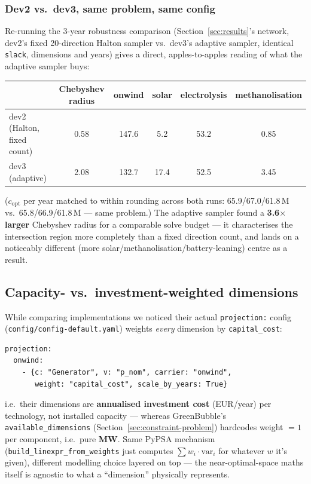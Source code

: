 \documentclass[11pt]{article}
\begin{document}
\subsubsection{Dev2 vs.\ dev3, same problem, same config}
Re-running the 3-year robustness comparison (Section~\ref{sec:results}'s
network, dev2's fixed 20-direction Halton sampler vs.\ dev3's adaptive
sampler, identical \texttt{slack}, dimensions and years) gives a direct,
apples-to-apples reading of what the adaptive sampler buys:

\begin{center}
\small
\begin{tabular}{@{}lccccc@{}}
\toprule
 & Chebyshev radius & onwind & solar & electrolysis & methanolisation \\
\midrule
dev2 (Halton, fixed count) & 0.58 & 147.6 & 5.2 & 53.2 & 0.85 \\
dev3 (adaptive)            & 2.08 & 132.7 & 17.4 & 52.5 & 3.45 \\
\bottomrule
\end{tabular}
\end{center}
($c_{\mathrm{opt}}$ per year matched to within rounding across both runs:
65.9/67.0/61.8\,M vs.\ 65.8/66.9/61.8\,M --- same problem.) The adaptive
sampler found a \textbf{3.6$\times$ larger} Chebyshev radius for a
comparable solve budget --- it characterises the intersection region more
completely than a fixed direction count, and lands on a noticeably
different (more solar/methanolisation/battery-leaning) centre as a result.

\subsection{Capacity- vs.\ investment-weighted dimensions}
\label{sec:weighting}
While comparing implementations we noticed their actual \texttt{projection:}
config (\texttt{config/config-}\allowbreak\texttt{default.yaml}) weights
\emph{every} dimension by \texttt{capital\_cost}:
\begin{lstlisting}
projection:
  onwind:
    - {c: "Generator", v: "p_nom", carrier: "onwind",
       weight: "capital_cost", scale_by_years: True}
\end{lstlisting}
i.e.\ their dimensions are \textbf{annualised investment cost} (EUR/year)
per technology, not installed capacity --- whereas GreenBubble's
\texttt{available\_dimensions} (Section~\ref{sec:constraint-problem})
hardcodes weight $=1$ per component, i.e.\ pure \textbf{MW}. Same PyPSA
mechanism (\texttt{build\_linexpr\_from\_weights} just computes
$\sum w_i \cdot \text{var}_i$ for whatever $w$ it's given), different
modelling choice layered on top --- the near-optimal-space maths itself is
agnostic to what a ``dimension'' physically represents.
\end{document}
